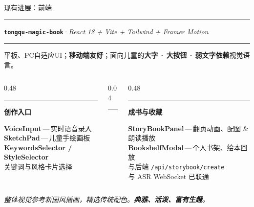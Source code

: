 \documentclass{beamer}
\newcommand{\kw}[1]{\textcolor{importantred}{\textbf{#1}}}
\newcommand{\goldrule}{\par\vspace{3pt}\noindent\textcolor{accentgold!60}{\rule{\linewidth}{0.4pt}}\par\vspace{3pt}}
\newcommand{\sidehead}[2][buptred]{%
  {\color{#1}\rule[-0.15em]{2.5pt}{1.0em}}\hspace{0.45em}\textbf{\small\color{darkred}#2}\par
  \vspace{2pt}%
}
\newcommand{\heroline}[1]{%
  {\centering\color{darkred}\itshape\small #1\par}%
}
\begin{document}
\begin{frame}[t]{现有进展：前端}
  \vspace{0.05cm}
  \noindent\textcolor{buptred}{\rule[-0.15em]{2.5pt}{1em}}\hspace{0.5em}%
  \textbf{\small\color{darkred}\texttt{tongqu-magic-book}}\;\textcolor{gray!80}{·}\;\textit{\footnotesize React 18 + Vite + Tailwind + Framer Motion}
  \goldrule

  \footnotesize
  平板、PC自适应UI；\kw{移动端友好}；面向儿童的\textbf{大字\,·\,大按钮\,·\,弱文字依赖}视觉语言。

  \vspace{0.35cm}
  \begin{columns}[T, onlytextwidth]
      \begin{column}[T]{0.48\linewidth}
          \sidehead{创作入口}
          \scriptsize
          \textcolor{accentred}{\checkmark}\; \textbf{VoiceInput}\,—\,实时语音录入\\[2pt]
          \textcolor{accentred}{\checkmark}\; \textbf{SketchPad}\,—\,儿童手绘画板\\[2pt]
          \textcolor{accentred}{\checkmark}\; \textbf{KeywordsSelector / StyleSelector}\\\phantom{\textcolor{accentred}{\checkmark}}\;\;关键词与风格卡片选择
      \end{column}
      \begin{column}[T]{0.04\linewidth}
          \centering\textcolor{accentgold!60}{\rule{0.4pt}{4.4em}}
      \end{column}
      \begin{column}[T]{0.48\linewidth}
          \sidehead[accentgold]{成书与收藏}
          \scriptsize
          \textcolor{accentred}{\checkmark}\; \textbf{StoryBookPanel}\,—\,翻页动画、配图 \& 朗读播放\\[2pt]
          \textcolor{accentred}{\checkmark}\; \textbf{BookshelfModal}\,—\,个人书架、绘本回放\\[2pt]
          \textcolor{accentred}{\checkmark}\; 与后端 \texttt{/api/storybook/create}\\\phantom{\textcolor{accentred}{\checkmark}}\;\;与 ASR WebSocket 已联通
      \end{column}
  \end{columns}

  \vspace{0.35cm}
  \heroline{整体视觉参考新国风插画，精选传统配色。\textbf{典雅、活泼、富有生趣}。}
\end{frame}
\end{document}

